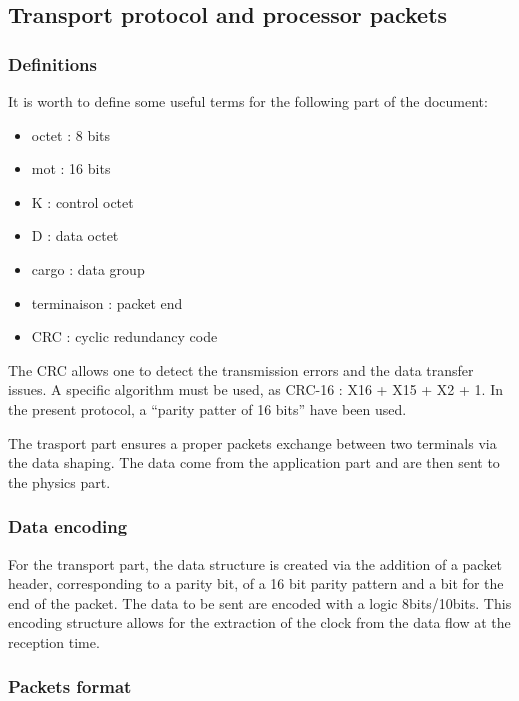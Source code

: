 \subsection{Transport protocol and processor packets}

\subsubsection{Definitions\newline}
	It is worth to define some useful terms for the following part of the document:

	\begin{itemize}
		\item octet : 8 bits
		\item mot : 16 bits
		\item K : control octet
		\item D : data octet
		\item cargo : data group
		\item terminaison : packet end
		\item CRC : cyclic redundancy code \newline
	\end{itemize}

The CRC allows one to detect the transmission errors and the data transfer issues. A specific algorithm must be used, as CRC-16 : X16 + X15 + X2 + 1. In the present protocol, a \enquote{parity patter of 16 bits} have been used.

The trasport part ensures a proper packets exchange between two terminals via the data shaping. The data come from the application part and are then sent to the physics part.\newline

\subsubsection{Data encoding\newline}
For the transport part, the data structure is created via the addition of a packet header, corresponding to a parity bit, of a 16 bit parity pattern and a bit for the end of the packet.
The data to be sent are encoded with a logic 8bits/10bits. This encoding structure allows for the extraction of the clock from the data flow at the reception time.

\subsubsection{Packets format\newline}

